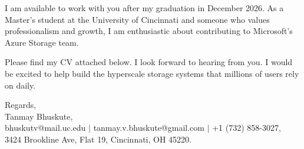 \documentclass[11pt]{letter}
\begin{document}
\begin{letter}{}
I am available to work with you after my graduation in December 2026. As a Master's student at the University of Cincinnati and someone who values professionalism and growth, I am enthusiastic about contributing to Microsoft's Azure Storage team.

Please find my CV attached below. I look forward to hearing from you. I would be excited to help build the hyperscale storage systems that millions of users rely on daily.

{\setlength{\parskip}{0pt}
Regards,\\
Tanmay Bhuskute,\\
bhuskutv@mail.uc.edu $\mid$ tanmay.v.bhuskute@gmail.com $\mid$ +1 (732) 858-3027,\\
3424 Brookline Ave, Flat 19, Cincinnati, OH 45220.
}

\end{letter}
\end{document}

